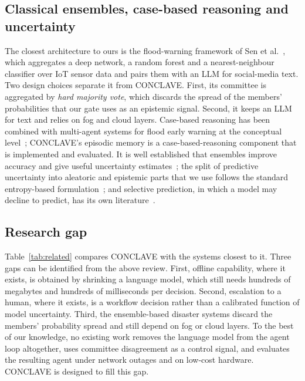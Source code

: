 \documentclass[journal]{IEEEtran}
\begin{document}
\subsection{Classical ensembles, case-based reasoning and uncertainty}
The closest architecture to ours is the flood-warning framework of Sen et
al.~\cite{sen2026context}, which aggregates a deep network, a random forest
and a nearest-neighbour classifier over IoT sensor data and pairs them with an
LLM for social-media text. Two design choices separate it from CONCLAVE.
First, its committee is aggregated by \emph{hard majority vote}, which discards
the spread of the members' probabilities that our gate uses as an epistemic
signal. Second, it keeps an LLM for text and relies on fog and cloud layers.
Case-based reasoning has been combined with multi-agent systems for flood early
warning at the conceptual level~\cite{rashid2024integrating}; CONCLAVE's
episodic memory is a case-based-reasoning component that is implemented and
evaluated. It is well established that ensembles improve accuracy and give
useful uncertainty
estimates~\cite{dietterich2000ensemble,breiman2001randomforest,lakshminarayanan2017deepensembles};
the split of predictive uncertainty into aleatoric and epistemic parts that we
use follows the standard entropy-based
formulation~\cite{hullermeier2021aleatoric}; and selective prediction, in which
a model may decline to predict, has its own
literature~\cite{elyaniv2010selective,geifman2017selectivenet}.

\subsection{Research gap}
Table~\ref{tab:related} compares CONCLAVE with the systems closest to it. Three
gaps can be identified from the above review. First, offline capability, where
it exists, is obtained by shrinking a language model, which still needs
hundreds of megabytes and hundreds of milliseconds per decision. Second,
escalation to a human, where it exists, is a workflow decision rather than a
calibrated function of model uncertainty. Third, the ensemble-based disaster
systems discard the members' probability spread and still depend on fog or
cloud layers. To the best of our knowledge, no existing work removes the
language model from the agent loop altogether, uses committee disagreement as
a control signal, and evaluates the resulting agent under network outages and
on low-cost hardware. CONCLAVE is designed to fill this gap.
\end{document}
